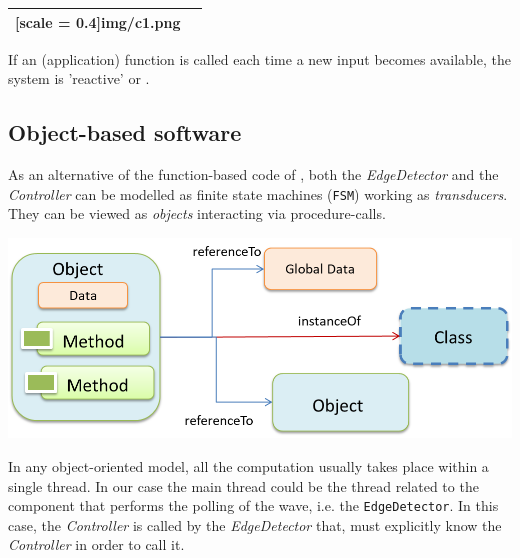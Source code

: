 \documentclass[10pt,a4paper,openright,twoside]{../llncs}
\newcommand{\code}[1]{{\color{blue}{\texttt{#1}}}}
\begin{document}
\begin{tabular}{|c|c|}
[scale = 0.4]{img/c1.png}\\
\hline 
\end{tabular}

If an (application) function is called each time a new input becomes available, the system is 'reactive' or \code{event-driven}.



\subsection{Object-based software}
As an alternative of the function-based code of , both the \textit{EdgeDetector} and the \textit{Controller} can be modelled as finite state machines (\texttt{FSM}) working as \textit{transducers}. 
They can be viewed as \textit{objects} interacting via procedure-calls.


\includegraphics[scale = 0.4]{img/c2.png}

In any object-oriented model, all the computation usually takes place within a single thread. In our case the main thread could be the thread related to the component that performs the polling of the wave, i.e. the  \texttt{EdgeDetector}.  In this case, the \textit{Controller} is called by the \textit{EdgeDetector} that, must explicitly know the \textit{Controller} in order to call it. 
\end{document}
